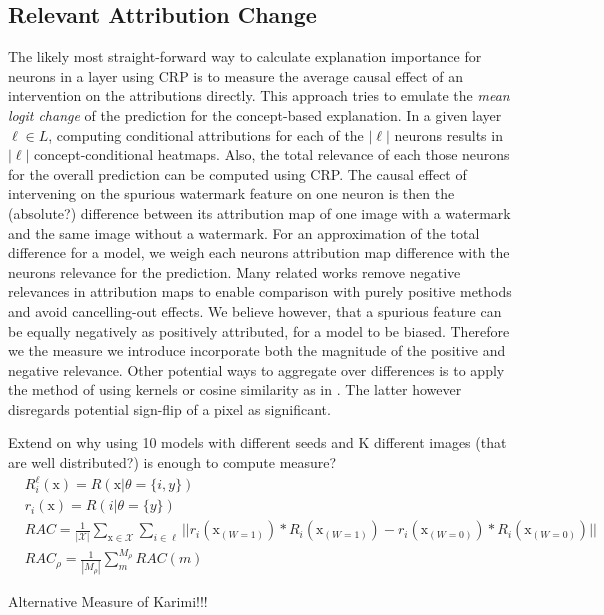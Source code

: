 \subsection{Relevant Attribution Change}
The likely most straight-forward way to calculate explanation importance for neurons in a layer using CRP is to measure the average causal effect of an intervention on the attributions directly. This approach tries to emulate the \textit{mean logit change} of the prediction for the concept-based explanation. In a given layer $\ell \in L$, computing conditional attributions for each of the $|\ell|$ neurons results in $|\ell|$ concept-conditional heatmaps. Also, the total relevance of each those neurons for the overall prediction can be computed using CRP.
The causal effect of intervening on the spurious watermark feature on one neuron is then the (absolute?) difference between its attribution map of one image with a watermark and the same image without a watermark. For an approximation of the total difference for a model, we weigh each neurons attribution map difference with the neurons relevance for the prediction. 
Many related works remove negative relevances in attribution maps to enable comparison with purely positive methods and avoid cancelling-out effects. We believe however, that a spurious feature can be equally negatively as positively attributed, for a model to be biased. Therefore we the measure we introduce incorporate both the magnitude of the positive and negative relevance. 
Other potential ways to aggregate over differences is to apply the method of \cite{Karimi2023} using kernels or cosine similarity as in \cite{Dreyer2023a}. The latter however disregards potential sign-flip of a pixel as significant. 

Extend on why using 10 models with different seeds and K different images (that are well distributed?) is enough to compute measure? 
\begin{align*}
& R_i^{\ell}(\mathrm{x}) = R(\mathrm{x} | \theta=\{i, y\}) \\
& r_i(\mathrm{x}) = R(i | \theta=\{y\}) \\
& RAC = \frac{1}{|\mathcal{X}| }\sum_{\mathrm{x} \in \mathcal{X}} \sum_{i \in \ell} || r_i(\mathrm{x}_{(W=1)}) * R_i(\mathrm{x}_{(W=1)}) -  r_i(\mathrm{x}_{(W=0)}) * R_i(\mathrm{x}_{(W=0)})  || \\
& RAC_{\rho} = \frac{1}{|M_\rho|}\sum_{m}^{M_{\rho}} RAC(m)
\end{align*}

Alternative Measure of Karimi!!!

